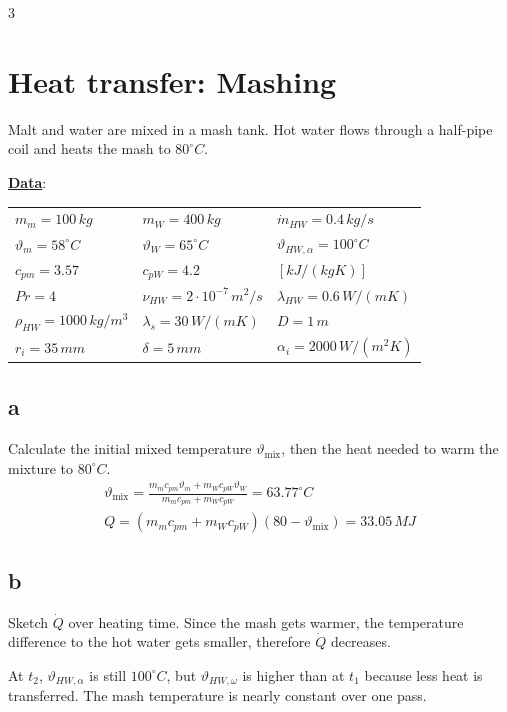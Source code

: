 \documentclass[9pt, landscape, a4paper]{article}
\begin{document}
\clearpage
\begin{multicols*}{3}
\raggedcolumns
\footnotesize
\section{Heat transfer: Mashing}
Malt and water are mixed in a mash tank. Hot water flows through a half-pipe
coil and heats the mash to $80^\circ C$.

\textbf{\underline{Data}}:
\begin{center}
\setlength{\tabcolsep}{3pt}
\renewcommand{\arraystretch}{1.2}
\begin{tabular}{@{}lll@{}}
  $m_m=100\,kg$ & $m_W=400\,kg$ & $\dot m_{HW}=0.4\,kg/s$\\
  $\vartheta_m=58^\circ C$ & $\vartheta_W=65^\circ C$ &
  $\vartheta_{HW,\alpha}=100^\circ C$\\
  $c_{pm}=3.57$ & $c_{pW}=4.2$ & $[kJ/(kgK)]$\\
  $Pr=4$ & $\nu_{HW}=2\cdot10^{-7}\,m^2/s$ &
  $\lambda_{HW}=0.6\,W/(mK)$\\
  $\rho_{HW}=1000\,kg/m^3$ & $\lambda_s=30\,W/(mK)$ & $D=1\,m$\\
  $r_i=35\,mm$ & $\delta=5\,mm$ & $\alpha_i=2000\,W/(m^2K)$
\end{tabular}
\end{center}
\renewcommand{\arraystretch}{1}

\subsection*{a}
Calculate the initial mixed temperature $\vartheta_\text{mix}$, then the heat
needed to warm the mixture to $80^\circ C$.
\begin{gather*}
  \vartheta_\text{mix} =
  \frac{m_m c_{pm}\vartheta_m + m_W c_{pW}\vartheta_W}
  {m_m c_{pm}+m_W c_{pW}}
  =63.77^\circ C\\
  Q =
  \left(m_m c_{pm}+m_W c_{pW}\right)
  \left(80-\vartheta_\text{mix}\right)
  =33.05\,MJ
\end{gather*}

\subsection*{b}
Sketch $\dot Q$ over heating time. Since the mash gets warmer, the temperature
difference to the hot water gets smaller, therefore $\dot Q$ decreases.

At $t_2$, $\vartheta_{HW,\alpha}$ is still $100^\circ C$, but
$\vartheta_{HW,\omega}$ is higher than at $t_1$ because less heat is transferred.
The mash temperature is nearly constant over one pass.


\end{multicols*}
\end{document}
